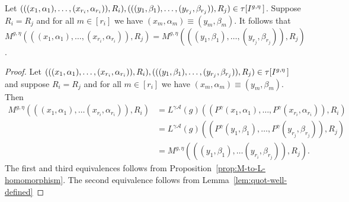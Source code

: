 \documentclass[../main/thesis.tex]{subfiles}
\begin{document}
\begin{lem}
  Let $(((x_1, \alpha_1), \ldots, (x_{r_i}, \alpha_{r_i})), R_i), (((y_1,
  \beta_1), \ldots, (y_{r_{j}}, \beta_{r_j})), R_j) \in \tau[I^{g,
      \eta} \,]$. Suppose $R_i = R_j$ and for all $m \in [r_i]$ we have $(x_m,
  \alpha_m) \equiv (y_m, \beta_m)$. It follows that $M^{g, \eta}(((x_1,
  \alpha_1), \ldots, (x_{r_i}, \alpha_{r_i})), R_j) = M^{g, \eta} (((y_1,
  \beta_1), \ldots, (y_{r_{j}}, \beta_{r_j})), R_j)$.
  \label{lem:M-quot-well-defined}
\end{lem}
\begin{proof}
  Let $(((x_1, \alpha_1), \ldots, (x_{r_i}, \alpha_{r_i})), R_i), (((y_1,
  \beta_1), \ldots, (y_{r_{j}}, \beta_{r_j})), R_j) \in \tau[I^{g,
      \eta} \,]$ and suppose $R_i = R_j$ and for all $m \in [r_i]$ we have
  $(x_m, \alpha_m) \equiv (y_m, \beta_m)$. Then
  \begin{align*}
    M^{g, \eta}(((x_1, \alpha_1), \ldots (x_{r_i}, \alpha_{r_i})), R_i)  &= L^{\gamma \mathcal{A}}(g)((P^{\gamma}(x_1, \alpha_1), \ldots, P^{\gamma}(x_{r_i}, \alpha_{r_i})), R_i)\\
                                                                         &= L^{\gamma \mathcal{A}}(g)((P^{\gamma}(y_1, \beta_1), \ldots, P^{\gamma}(y_{r_j}, \beta_{r_j})), R_j) \\
                                                                         &= M^{g, \eta}(((y_1, \beta_1), \ldots (y_{r_i}, \beta_{r_j})), R_j).
  \end{align*}
  The first and third equivalences follows from
  Proposition~\ref{prop:M-to-L-homomorphism}. The second equivalence follows
  from Lemma~\ref{lem:quot-well-defined}
\end{proof}
\end{document}
